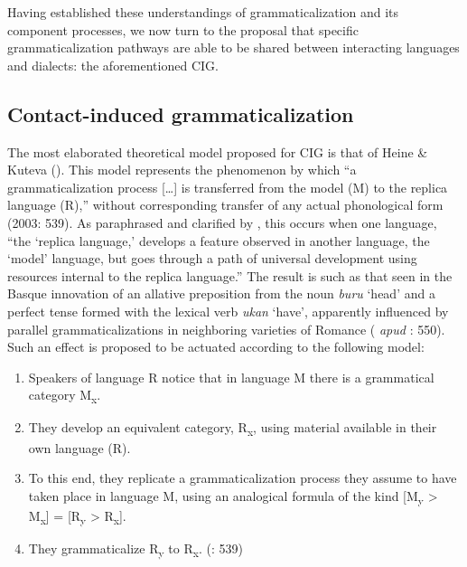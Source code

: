\documentclass[output=paper]{langsci/langscibook}
\begin{document}
Having established these understandings of grammaticalization and its component processes, we now turn to the proposal that specific grammaticalization pathways are able to be shared between interacting languages and dialects: the aforementioned CIG.

\subsection{Contact-induced grammaticalization}\label{sec:contgram}


The most elaborated theoretical model proposed for CIG is that of Heine \& Kuteva (\citeyear{HeineKuteva2003,HeineKuteva2005}). This model represents the phenomenon by which “a grammaticalization process […] is transferred from the model (M) to the replica language (R),” without corresponding transfer of any actual phonological form (2003: 539). As paraphrased and clarified by \citet[215]{Law2014}, this occurs when one language, “the ‘replica language,’ develops a feature observed in another language, the ‘model’ language, but goes through a path of universal development using resources internal to the replica language.” The result is such as that seen in the Basque innovation of an allative preposition from the noun \textit{buru} ‘head’ and a perfect tense formed with the lexical verb \textit{ukan} ‘have’, apparently influenced by parallel grammaticalizations in neighboring varieties of Romance (\citealt{Haase1992} \textit{apud} \citealt{HeineKuteva2003}: 550). Such an effect is proposed to be actuated according to the following model:

\begin{enumerate}
\item
Speakers of language R notice that in language M there is a grammatical category M\textsubscript{x}.
\item
They develop an equivalent category, R\textsubscript{x}, using material available in their own language (R).
\item
To this end, they replicate a grammaticalization process they assume to have taken place in language M, using an analogical formula of the kind [M\textsubscript{y} > M\textsubscript{x}] = [R\textsubscript{y} > R\textsubscript{x}].
\item
They grammaticalize R\textsubscript{y} to R\textsubscript{x}.
(\citealt{HeineKuteva2003}: 539)
\end{enumerate}
\end{document}
